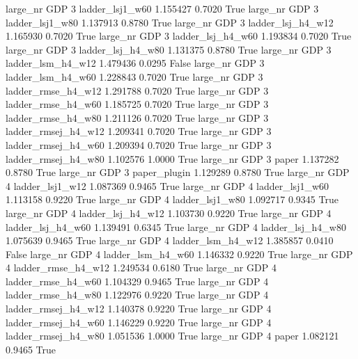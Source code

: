   large_nr      GDP                 3     ladder_lsj1_w60   1.155427      0.7020    True
  large_nr      GDP                 3     ladder_lsj1_w80   1.137913      0.8780    True
  large_nr      GDP                 3   ladder_lsj_h4_w12   1.165930      0.7020    True
  large_nr      GDP                 3   ladder_lsj_h4_w60   1.193834      0.7020    True
  large_nr      GDP                 3   ladder_lsj_h4_w80   1.131375      0.8780    True
  large_nr      GDP                 3   ladder_lsm_h4_w12   1.479436      0.0295   False
  large_nr      GDP                 3   ladder_lsm_h4_w60   1.228843      0.7020    True
  large_nr      GDP                 3  ladder_rmse_h4_w12   1.291788      0.7020    True
  large_nr      GDP                 3  ladder_rmse_h4_w60   1.185725      0.7020    True
  large_nr      GDP                 3  ladder_rmse_h4_w80   1.211126      0.7020    True
  large_nr      GDP                 3 ladder_rmsej_h4_w12   1.209341      0.7020    True
  large_nr      GDP                 3 ladder_rmsej_h4_w60   1.209394      0.7020    True
  large_nr      GDP                 3 ladder_rmsej_h4_w80   1.102576      1.0000    True
  large_nr      GDP                 3               paper   1.137282      0.8780    True
  large_nr      GDP                 3        paper_plugin   1.129289      0.8780    True
  large_nr      GDP                 4     ladder_lsj1_w12   1.087369      0.9465    True
  large_nr      GDP                 4     ladder_lsj1_w60   1.113158      0.9220    True
  large_nr      GDP                 4     ladder_lsj1_w80   1.092717      0.9345    True
  large_nr      GDP                 4   ladder_lsj_h4_w12   1.103730      0.9220    True
  large_nr      GDP                 4   ladder_lsj_h4_w60   1.139491      0.6345    True
  large_nr      GDP                 4   ladder_lsj_h4_w80   1.075639      0.9465    True
  large_nr      GDP                 4   ladder_lsm_h4_w12   1.385857      0.0410   False
  large_nr      GDP                 4   ladder_lsm_h4_w60   1.146332      0.9220    True
  large_nr      GDP                 4  ladder_rmse_h4_w12   1.249534      0.6180    True
  large_nr      GDP                 4  ladder_rmse_h4_w60   1.104329      0.9465    True
  large_nr      GDP                 4  ladder_rmse_h4_w80   1.122976      0.9220    True
  large_nr      GDP                 4 ladder_rmsej_h4_w12   1.140378      0.9220    True
  large_nr      GDP                 4 ladder_rmsej_h4_w60   1.146229      0.9220    True
  large_nr      GDP                 4 ladder_rmsej_h4_w80   1.051536      1.0000    True
  large_nr      GDP                 4               paper   1.082121      0.9465    True
